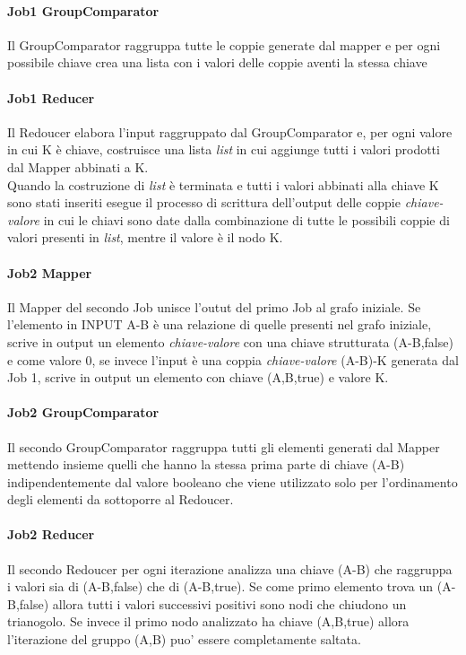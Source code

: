 \documentclass[paper=a4, fontsize=11pt]{scrartcl}	%
\numberwithin{equation}{section}															%
\numberwithin{figure}{section}																%
\numberwithin{table}{section}																%
\begin{document}
\paragraph{Job1 GroupComparator}
Il GroupComparator raggruppa tutte le coppie generate dal mapper e per ogni possibile chiave crea una lista con i valori delle coppie aventi la stessa chiave
\paragraph{Job1 Reducer}

Il Redoucer elabora l'input raggruppato dal GroupComparator e, per ogni valore in cui K è chiave, costruisce una lista \textit{list} in cui aggiunge tutti i valori prodotti dal Mapper abbinati a K.\\
Quando la costruzione di \textit{list} è terminata e tutti i valori abbinati alla chiave K sono stati inseriti esegue il processo di scrittura dell'output delle coppie \textit{chiave-valore} in cui le chiavi sono date dalla combinazione di tutte le possibili coppie di valori presenti in \textit{list}, mentre il valore è il nodo K.

\paragraph{Job2 Mapper}
Il Mapper del secondo Job unisce l'outut del primo Job al grafo iniziale. Se l'elemento in INPUT A-B è una relazione di quelle presenti nel grafo iniziale, scrive in output un elemento \textit{chiave-valore} con una chiave strutturata (A-B,false) e come valore 0, se invece l'input è una coppia \textit{chiave-valore} (A-B)-K generata dal Job 1, scrive in output un elemento con chiave (A,B,true) e valore K.
\paragraph{Job2 GroupComparator}
Il secondo GroupComparator raggruppa tutti gli elementi generati dal Mapper mettendo insieme quelli che hanno la stessa prima parte di chiave (A-B) indipendentemente dal valore booleano che viene utilizzato solo per l'ordinamento degli elementi da sottoporre al Redoucer.

\paragraph{Job2 Reducer}
Il secondo Redoucer per ogni iterazione analizza una chiave (A-B) che raggruppa i valori sia di (A-B,false) che di (A-B,true). Se come primo elemento trova un (A-B,false) allora tutti i valori successivi positivi sono nodi che chiudono un trianogolo. Se invece il primo nodo analizzato ha chiave (A,B,true) allora l'iterazione del gruppo (A,B) puo' essere completamente saltata.
\end{document}

